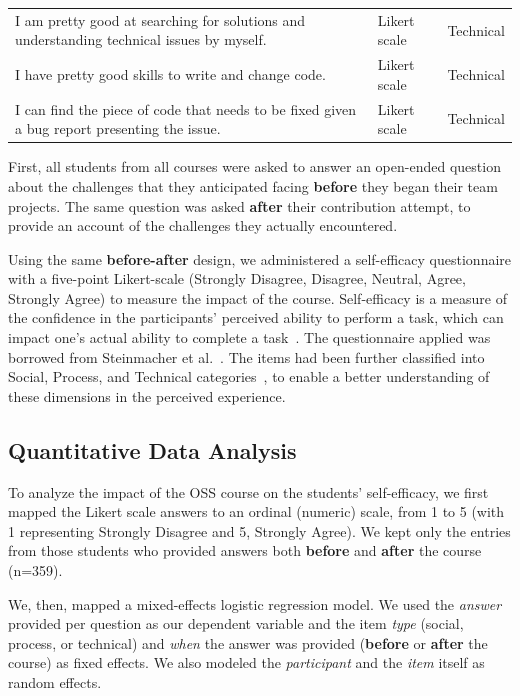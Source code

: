 \documentclass[sigconf]{acmart}
\begin{document}
\begin{sloppy}
\begin{table}[]
\begin{tabular}{p{13.6cm}ll}
I am pretty good at searching for solutions and understanding technical issues by myself.& Likert scale & Technical                      \\
I have pretty good skills to write and change code.&Likert scale & Technical                                                        \\

I can find the piece of code that needs to be fixed given a bug report presenting the issue.& Likert scale  & Technical                  \\

\bottomrule
\end{tabular}
\label{tab:survey}
\end{table}

First, all students from all courses were asked to answer an open-ended question about the challenges that they anticipated facing \textbf{before} they began their team projects. The same question was asked \textbf{after} their contribution attempt, to provide an account of the challenges they actually encountered. 

Using the same \textbf{before-after} design, we administered a self-efficacy questionnaire with a five-point Likert-scale (Strongly Disagree, Disagree, Neutral, Agree, Strongly Agree) to measure the impact of the course. Self-efficacy  is  a  measure  of  the  confidence  in  the participants’ perceived ability to perform a task, which can impact one’s actual ability to complete a task~\cite{bandura1986explanatory}. The questionnaire applied was borrowed from Steinmacher et al.~\cite{steinmacher2016overcoming}. The items had been further classified into Social, Process, and Technical categories~\cite{steinmacher2018let}, to enable a better understanding of these dimensions in the perceived experience.


\subsection{Quantitative Data Analysis}

To analyze the impact of the OSS course on the students' self-efficacy, we first mapped the Likert scale answers to an ordinal (numeric) scale, from 1 to 5 (with 1 representing Strongly Disagree and 5, Strongly Agree). We kept only the entries from those students who provided answers both \textbf{before} and \textbf{after} the course (n=359).

We, then, mapped a mixed-effects logistic regression model. We used the \textit{answer} provided per question as our dependent variable and the item \textit{type} (social, process, or technical) and \textit{when} the answer was provided (\textbf{before} or \textbf{after} the course) as fixed effects. We also modeled the \textit{participant} and the \textit{item} itself as random effects. 


\end{sloppy}
\end{document}
